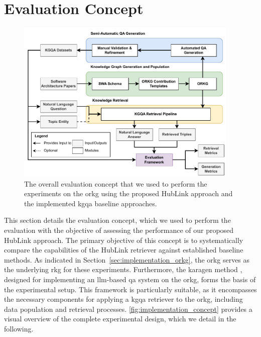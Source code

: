 \section{Evaluation Concept}
\label{sec:exp_prelim_evaluation_concept}

\begin{figure}[t]
    \centering
    \includegraphics[width=0.95\textwidth]{figures/experiments/orkg/figures-imp_concept_exp.drawio.pdf}
    \caption[Evaluation Concept for Evaluating HubLink on the ORKG]{The overall evaluation concept that we used to perform the experiments on the \gls{orkg} using the proposed HubLink approach and the implemented \gls{kgqa} baseline approaches.}
    \label{fig:implementation_concept}
\end{figure}

This section details the evaluation concept, which we used to perform the evaluation with the objective of assessing the performance of our proposed HubLink approach. The primary objective of this concept is to systematically compare the capabilities of the HubLink retriever against established baseline methods. As indicated in Section~\ref{sec:implementation_orkg}, the \gls{orkg} serves as the underlying \gls{rkg} for these experiments. Furthermore, the \gls{karagen} method \cite{kaplan_combining_2024}, designed for implementing an \gls{llm}-based \gls{qa} system on the \gls{orkg}, forms the basis of the experimental setup. This framework is particularly suitable, as it encompasses the necessary components for applying a \gls{kgqa} retriever to the \gls{orkg}, including data population and retrieval processes. \autoref{fig:implementation_concept} provides a visual overview of the complete experimental design, which we detail in the following.

